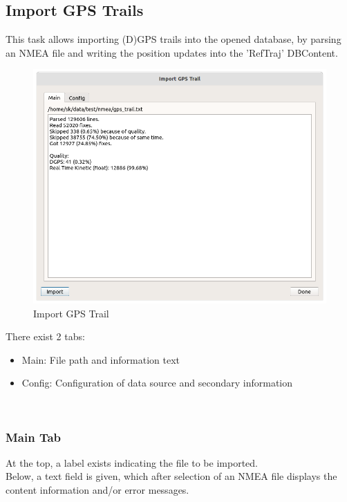 \subsection{Import GPS Trails}
\label{sec:ui_import_gps}

This task allows importing (D)GPS trails into the opened database, by parsing an NMEA file and writing the position updates into the 'RefTraj' DBContent.

\begin{figure}[H]
  \center
    \includegraphics[width=16cm]{figures/gps_import_task.png}
  \caption{Import GPS Trail}
\end{figure}

There exist 2 tabs:

\begin{itemize}
\item Main: File path and information text
\item Config: Configuration of data source and secondary information
\end{itemize}
\ \\

\subsubsection{Main Tab}

At the top, a label exists indicating the file to be imported. \\

Below, a text field is given, which after selection of an NMEA file displays the content information and/or error messages. \\

